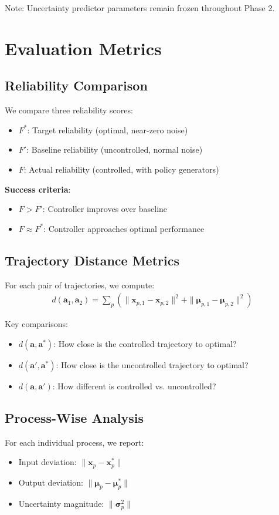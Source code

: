\documentclass[11pt,a4paper]{article}
\begin{document}
Note: Uncertainty predictor parameters remain frozen throughout Phase 2.

\section{Evaluation Metrics}

\subsection{Reliability Comparison}
We compare three reliability scores:
\begin{itemize}
    \item $F^*$: Target reliability (optimal, near-zero noise)
    \item $F'$: Baseline reliability (uncontrolled, normal noise)
    \item $F$: Actual reliability (controlled, with policy generators)
\end{itemize}

\textbf{Success criteria}:
\begin{itemize}
    \item $F > F'$: Controller improves over baseline
    \item $F \approx F^*$: Controller approaches optimal performance
\end{itemize}

\subsection{Trajectory Distance Metrics}
For each pair of trajectories, we compute:
\begin{align}
d(\mathbf{a}_1, \mathbf{a}_2) = \sum_p \left( \|\mathbf{x}_{p,1} - \mathbf{x}_{p,2}\|^2 + \|\boldsymbol{\mu}_{p,1} - \boldsymbol{\mu}_{p,2}\|^2 \right)
\end{align}

Key comparisons:
\begin{itemize}
    \item $d(\mathbf{a}, \mathbf{a}^*)$: How close is the controlled trajectory to optimal?
    \item $d(\mathbf{a}', \mathbf{a}^*)$: How close is the uncontrolled trajectory to optimal?
    \item $d(\mathbf{a}, \mathbf{a}')$: How different is controlled vs. uncontrolled?
\end{itemize}

\subsection{Process-Wise Analysis}
For each individual process, we report:
\begin{itemize}
    \item Input deviation: $\|\mathbf{x}_p - \mathbf{x}_p^*\|$
    \item Output deviation: $\|\boldsymbol{\mu}_p - \boldsymbol{\mu}_p^*\|$
    \item Uncertainty magnitude: $\|\boldsymbol{\sigma}_p^2\|$
\end{itemize}
\end{document}
